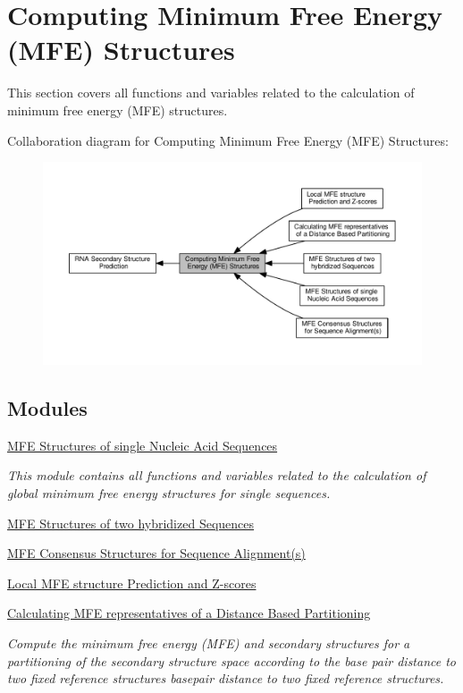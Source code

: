 \hypertarget{group__mfe__fold}{}\section{Computing Minimum Free Energy (M\+F\+E) Structures}
\label{group__mfe__fold}


This section covers all functions and variables related to the calculation of minimum free energy (M\+F\+E) structures.  


Collaboration diagram for Computing Minimum Free Energy (M\+F\+E) Structures\+:
\nopagebreak
\begin{figure}[H]
\begin{center}
\leavevmode
\includegraphics[width=350pt]{group__mfe__fold}
\end{center}
\end{figure}
\subsection*{Modules}
\begin{DoxyCompactItemize}
\item 
\hyperlink{group__mfe__fold__single}{M\+F\+E Structures of single Nucleic Acid Sequences}
\begin{DoxyCompactList}\small\item\em This module contains all functions and variables related to the calculation of global minimum free energy structures for single sequences. \end{DoxyCompactList}\item 
\hyperlink{group__mfe__cofold}{M\+F\+E Structures of two hybridized Sequences}
\item 
\hyperlink{group__consensus__mfe__fold}{M\+F\+E Consensus Structures for Sequence Alignment(s)}
\item 
\hyperlink{group__local__mfe__fold}{Local M\+F\+E structure Prediction and Z-\/scores}
\item 
\hyperlink{group__kl__neighborhood__mfe}{Calculating M\+F\+E representatives of a Distance Based Partitioning}
\begin{DoxyCompactList}\small\item\em Compute the minimum free energy (M\+F\+E) and secondary structures for a partitioning of the secondary structure space according to the base pair distance to two fixed reference structures basepair distance to two fixed reference structures. \end{DoxyCompactList}\end{DoxyCompactItemize}
